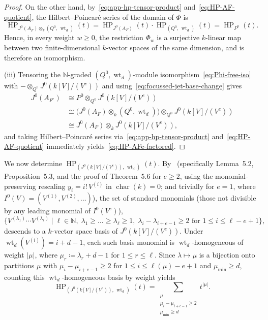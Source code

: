 \documentclass[a4paper, 12pt, reqno]{amsart}
\theoremstyle{remark}
\begin{document}
\begin{proof}
  On the other hand,
  by~\eqref{eq:app-hp-tensor-product} and~\eqref{eq:HP-AF-quotient},
  the Hilbert--Poincaré series of the domain of $\Phi$ is
  \begin{equation*}
    \operatorname{HP}_{J^0(A_F) \otimes_k (Q^0, \, \operatorname{wt}_d)}(t)
    = \operatorname{HP}_{J^0(A_F)}(t) \cdot \operatorname{HP}_{(Q^0, \, \operatorname{wt}_d)}(t)
    = \operatorname{HP}_{P^0}(t).
  \end{equation*}
  Hence,
  in every weight $w \ge 0$,
  the restriction $\Phi_w$ is a surjective $k$-linear map between two finite-dimensional $k$-vector spaces of the same dimension,
  and is therefore an isomorphism.

  (iii) Tensoring the $\mathbb{N}$-graded $(Q^0, \operatorname{wt}_d)$-module isomorphism~\eqref{eq:Phi-free-iso} with $- \otimes_{Q^0} J^0(k[V]/(V^e))$ and using~\eqref{eq:focussed-jet-base-change} gives
  \begin{align*}
    J^0(A_{F^e}) &\cong P^0 \otimes_{Q^0} J^0(k[V]/(V^e)) \\
                 &\cong \bigl(J^0(A_F) \otimes_k (Q^0, \operatorname{wt}_d)\bigr) \otimes_{Q^0} J^0(k[V]/(V^e)) \\
                 &\cong J^0(A_F) \otimes_k J^0(k[V]/(V^e)),
  \end{align*}
  and taking Hilbert--Poincaré series via~\eqref{eq:app-hp-tensor-product} and~\eqref{eq:HP-AF-quotient} immediately yields~\eqref{eq:HP-AFe-factored}.
\end{proof}

We now determine $\operatorname{HP}_{(J^0(k[V]/(V^e)), \, \operatorname{wt}_d)}(t)$.
By~\cite[Section~5]{bruschek_arc_2013}
(specifically Lemma~5.2, Proposition~5.3, and the proof of Theorem~5.6 for $e \ge 2$, using the monomial-preserving rescaling $y_i = i!\,V^{(i)}$ in $\operatorname{char}(k) = 0$;
and trivially for $e = 1$, where $I^0(V) = (V^{(1)}, V^{(2)}, \dots)$),
the set of standard monomials (those not divisible by any leading monomial of $I^0(V^e)$),
\begin{equation*}
  \{V^{(\lambda_1)} \cdots V^{(\lambda_\ell)} \mid \ell \in \mathbb{N},\; \lambda_1 \ge \dots \ge \lambda_\ell \ge 1,\; \lambda_i - \lambda_{i + e - 1} \ge 2 \text{ for } 1 \le i \le \ell - e + 1\},
\end{equation*}
descends to a $k$-vector space basis of $J^0(k[V]/(V^e))$.
Under $\operatorname{wt}_d(V^{(i)}) = i + d - 1$,
each such basis monomial is $\operatorname{wt}_d$-homogeneous of weight $|\mu|$,
where $\mu_r \coloneq \lambda_r + d - 1$ for $1 \le r \le \ell$.
Since $\lambda \mapsto \mu$ is a bijection onto partitions $\mu$ with $\mu_i - \mu_{i + e - 1} \ge 2$ for $1 \le i \le \ell(\mu) - e + 1$ and $\mu_{\mathrm{min}} \ge d$,
counting this $\operatorname{wt}_d$-homogeneous basis by weight yields
\begin{equation}
  \label{eq:HP-shifted-fat-point}
  \operatorname{HP}_{(J^0(k[V]/(V^e)), \, \operatorname{wt}_d)}(t) = \sum_{\substack{\mu \\ \mu_i - \mu_{i + e - 1} \ge 2 \\ \mu_{\mathrm{min}} \ge d}} t^{|\mu|}.
\end{equation}
\end{document}

